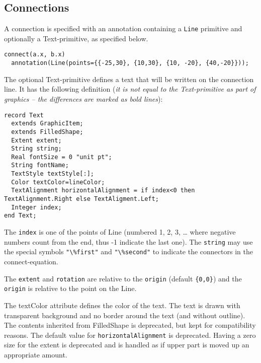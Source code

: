 \subsection{Connections}\label{connections1}

A connection is specified with an annotation containing a \lstinline!Line! primitive
and optionally a Text-primitive, as specified below.

\begin{example}
\begin{lstlisting}[language=modelica]
connect(a.x, b.x)
  annotation(Line(points={{-25,30}, {10,30}, {10, -20}, {40,-20}}));
\end{lstlisting}
\end{example}

The optional Text-primitive defines a text that will be written on the
connection line. It has the following definition (\emph{it is not equal
to the Text-primitive as part of graphics -- the differences are marked as bold lines}):
\begin{lstlisting}[language=modelica]
record Text
  extends GraphicItem;
  extends FilledShape;
  Extent extent;
  String string;
  Real fontSize = 0 "unit pt";
  String fontName;
  TextStyle textStyle[:];
  Color textColor=lineColor;
  TextAlignment horizontalAlignment = if index<0 then TextAlignment.Right else TextAligment.Left;
  Integer index;
end Text;
\end{lstlisting}

The \lstinline!index! is one of the points of Line (numbered 1, 2, 3, \ldots{} where
negative numbers count from the end, thus -1 indicate the last one). The \lstinline!string!
may use the special
symbols \lstinline!"\%first"! and \lstinline!"\%second"! to indicate the connectors in the
connect-equation.

The \lstinline!extent! and \lstinline!rotation! are relative to the \lstinline!origin! (default \lstinline!{0,0}!)
and the \lstinline!origin! is relative to the point on the Line.

The textColor attribute defines the color of the text. The text is drawn
with transparent background and no border around the text (and without
outline). The contents inherited from FilledShape is deprecated, but kept for compatibility reasons.
The default value for \lstinline!horizontalAlignment! is deprecated.
Having a zero size for the extent is deprecated and is handled as if upper part is moved up an appropriate amount.

